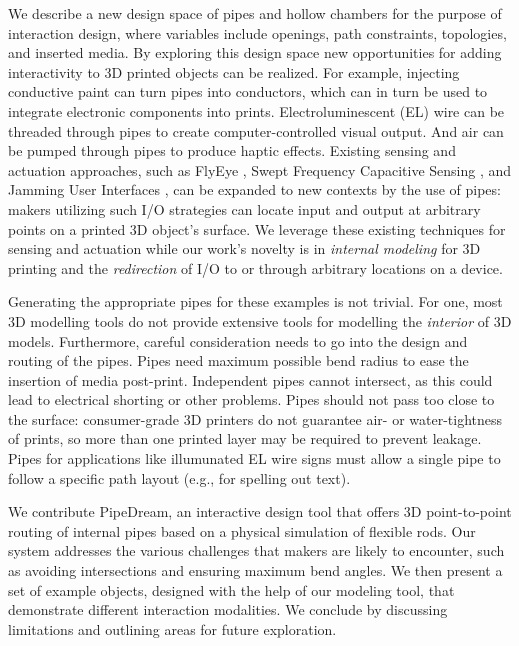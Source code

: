 We describe a new design space of pipes and hollow chambers for the purpose of interaction design, where variables include openings, path constraints, topologies, and inserted media. By exploring this design space new opportunities for adding interactivity to 3D printed objects can be realized. For example, injecting conductive paint can turn pipes into conductors, which can in turn be used to integrate electronic components into prints. Electroluminescent (EL) wire can be threaded through pipes to create computer-controlled visual output. And air can be pumped through pipes to produce haptic effects.  Existing sensing and actuation approaches, such as FlyEye \cite{Wimmer-flyeye}, Swept Frequency Capacitive Sensing \cite{Sato-touche}, and Jamming User Interfaces \cite{Follmer-jamming}, can be expanded to new contexts by the use of pipes: makers utilizing such I/O strategies can locate input and output at arbitrary points on a printed 3D object's surface.  We leverage these existing techniques for sensing and actuation while our work's novelty is in \emph{internal modeling} for 3D printing and the \emph{redirection} of I/O to or through arbitrary locations on a device.


Generating the appropriate pipes for these examples is not trivial.  For one, most 3D modelling tools do not provide extensive tools for modelling the  {\em interior} of 3D models. Furthermore, careful consideration needs to go into the design and routing of the pipes. Pipes need maximum possible bend radius to ease the insertion of media post-print.  Independent pipes cannot intersect, as this could lead to electrical shorting or other problems.  Pipes should not pass too close to the surface: consumer-grade 3D printers do not guarantee air- or water-tightness of prints, so more than one printed layer may be required to prevent leakage.  Pipes for applications like illumunated EL wire signs must allow a single pipe to follow a specific path layout (e.g., for spelling out text). 

We contribute PipeDream, an interactive design tool that offers 3D point-to-point routing of internal pipes based on a physical simulation of flexible rods. Our system addresses the various challenges that makers are likely to encounter, such as avoiding intersections and ensuring maximum bend angles. We then present a set of example objects, designed with the help of our modeling tool, that demonstrate different interaction modalities. We conclude by discussing limitations and outlining areas for future exploration. 

